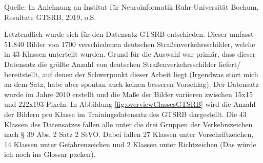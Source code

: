 \begin{table}[t]
    
    \caption{Übersicht der fünf besten (das Wort "beste" ist hier nicht weiter definiert- würde ich evtl durch "genausten" ersetzen)Einreichungen GTSRB Klassifizierung\label{table:TopGTRSBPaper}} 
    
    \hfill \break
    Quelle: In Anlehnung an Institut für Neuroinformatik Ruhr-Universität Bochum, Resultate GTSRB, 2019, o.S.
\end{table} 
Letztendlich wurde sich für den Datensatz \ac{GTSRB} entschieden. Dieser umfasst 51.840 Bilder von 1700 verschiedenen deutschen Straßenverkehrsschilder, welche in 43 Klassen unterteilt wurden. Grund für die Auswahl war primär, dass dieser Datensatz die größte Anzahl von deutschen Straßenverkehrsschilder liefert/ bereitstellt, auf denen  der Schwerpunkt dieser Arbeit liegt (Irgendwas stört mich an dem Satz, habe aber spontan auch keinen besseren Vorschlag). Der Datensatz wurde im Jahre 2010 erstellt und die Maße der Bilder variieren zwischen 15x15 und 222x193 Pixeln. In Abbildung \ref{fig:overviewClassesGTSRB} wird die Anzahl der Bildern pro Klasse im Trainingsdatensatz des \ac{GTSRB} dargestellt. Die 43 Klassen des Datensatzes fallen alle unter die drei Gruppen der Verkehrszeichen nach § 39 Abs. 2 Satz 2 \ac{StVO}. Dabei fallen 27 Klassen unter Vorschriftzeichen, 14 Klassen unter Gefahrenzeichen und 2 Klassen unter Richtzeichen (Das würde ich noch ins Glossar packen). 
